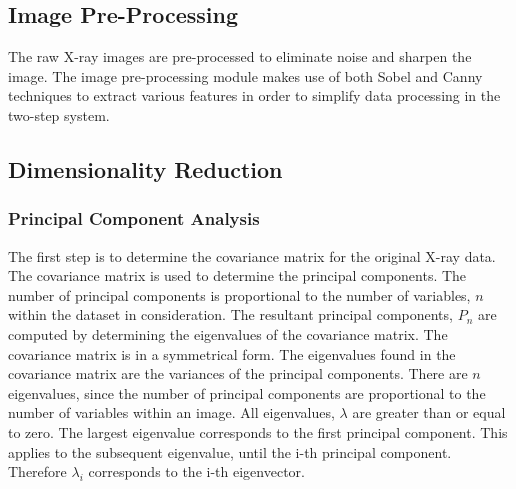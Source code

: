 \documentclass[11pt]{article}
\begin{document}
	\subsection{Image Pre-Processing}
	The raw X-ray images are pre-processed to eliminate noise and sharpen the image. The image pre-processing module makes use of both Sobel and Canny techniques to extract various features in order to simplify data processing in the two-step system.  
	
	\subsection{Dimensionality Reduction}
	\subsubsection{Principal Component Analysis}
	The first step is to determine the covariance matrix for the original X-ray data. The covariance matrix is used to determine the principal components. The number of principal components is proportional to the number of variables, $n$ within the dataset in consideration. The resultant principal components, $P_n$ are computed by determining the eigenvalues of the covariance matrix. The covariance matrix is in a symmetrical form. The eigenvalues found in the covariance matrix are the variances of the principal components.  There are $n$ eigenvalues, since the number of principal components are proportional to the number of variables within an image. All eigenvalues, $\lambda$ are greater than or equal to zero. The largest eigenvalue corresponds to the first principal component. This applies to the subsequent eigenvalue, until the i-th principal component. Therefore $\lambda_i$ corresponds to the i-th eigenvector.
	
\end{document}
